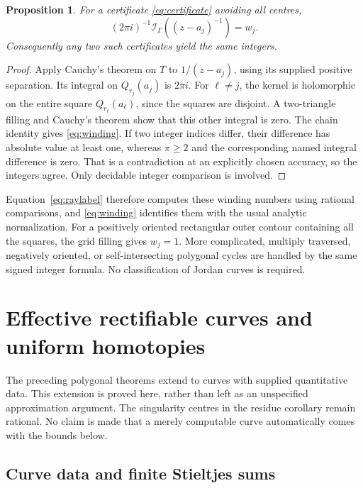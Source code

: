 \documentclass[11pt]{article}
\newtheorem{proposition}[theorem]{Proposition}
\theoremstyle{definition}
\newcommand{\Int}{\mathcal I}
\begin{document}
\begin{proposition}\label{prop:winding}
For a certificate \eqref{eq:certificate} avoiding all centres,
\begin{equation}\label{eq:winding}
 (2\pi i)^{-1}\Int_\Gamma((z-a_j)^{-1})=w_j.
\end{equation}
Consequently any two such certificates yield the same integers.
\end{proposition}
\begin{proof}
Apply Cauchy's theorem on \(T\) to \(1/(z-a_j)\), using its supplied
positive separation. Its integral on \(Q_{r_j}(a_j)\) is \(2\pi i\).
For \(\ell\ne j\), the kernel is holomorphic on the entire square
\(Q_{r_\ell}(a_\ell)\), since the squares are disjoint. A two-triangle
filling and Cauchy's theorem show that this other integral is zero.
The chain identity gives \eqref{eq:winding}. If two integer indices
differ, their difference has absolute value at least one, whereas
\(\pi\ge2\) and the corresponding named integral difference is zero.
That is a contradiction at an explicitly chosen accuracy, so the
integers agree. Only decidable integer comparison is involved.
\end{proof}

Equation~\eqref{eq:raylabel} therefore computes these winding numbers
using rational comparisons, and \eqref{eq:winding} identifies them with
the usual analytic normalization. For a positively oriented rectangular
outer contour containing all the squares, the grid filling gives
\(w_j=1\). More complicated, multiply traversed, negatively oriented,
or self-intersecting polygonal cycles are handled by the same signed
integer formula. No classification of Jordan curves is required.

\section{Effective rectifiable curves and uniform homotopies}\label{sec:curves}

The preceding polygonal theorems extend to curves with supplied
quantitative data. This extension is proved here, rather than left as
an unspecified approximation argument. The singularity centres in the
residue corollary remain rational. No claim is made that a merely
computable curve automatically comes with the bounds below.

\subsection{Curve data and finite Stieltjes sums}
\end{document}
